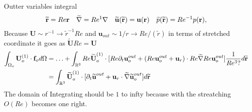 Outter variables integral
\begin{align}
    \widetilde{\textbf{r}} = Re \textbf{r}
    && \widetilde{\grad} = Re^{1} \grad
    && \widetilde{\textbf{u}}(\widetilde{\textbf{r}}) = \textbf{u}(\textbf{r})
    && \widetilde{p}(\widetilde{\textbf{r}}) = Re^{-1} p(\textbf{r}),
\end{align}
Because $\textbf{U}\sim r^{-1} \to \widetilde{r}^{-1} Re $ and $\textbf{u}_{out} \sim 1/r \to Re/(\widetilde{r} )$ in terms of stretched coordinate it goes as $\widetilde{\textbf{U}} Re = \textbf{U}$
\begin{align}
    \intO[o]{\textbf{U}_{o}^{(1)}\cdot \textbf{f}_{o}}
    &=
    \ldots +  \int_{\mathbb{R}^3}Re \widetilde{\textbf{U}}_{o}^{(1)}\cdot [Re\pddt \textbf{u}_o^{out}+  (Re \textbf{u}_{o}^{out}+\textbf{u}_r)\cdot Re \widetilde{\grad}  Re\textbf{u}_{o}^{out} ]\frac{1}{Re^3 ? } d\widetilde{\textbf{r}}\\
    &=\int_{\mathbb{R}^3} \widetilde{\textbf{U}}_{o}^{(1)}\cdot  [\pddt \widetilde{\textbf{u}}^{out}+ \textbf{u}_r \cdot  \widetilde{\grad}  \widetilde{\textbf{u}}_{o}^{out}] d\widetilde{\textbf{r}}
\end{align}
The domain of Integrating should be $1$ to infty because with the streatching $O(Re)$ becomes one right.

